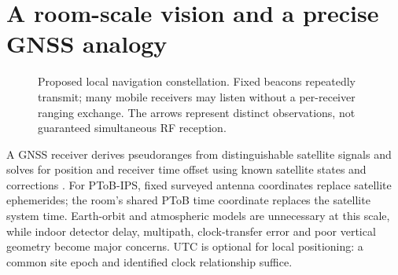 \documentclass[11pt,letterpaper]{article}
\begin{document}
\section{A room-scale vision and a precise GNSS analogy}\label{sec:vision}
\begin{figure}[ht]\centering
{}
\caption{Proposed local navigation constellation. Fixed beacons repeatedly transmit; many mobile receivers may listen without a per-receiver ranging exchange. The arrows represent distinct observations, not guaranteed simultaneous RF reception.}\label{fig:room}
\end{figure}

A GNSS receiver derives pseudoranges from distinguishable satellite signals and solves for position and receiver time offset using known satellite states and corrections \cite{esacode}. For PToB-IPS, fixed surveyed antenna coordinates replace satellite ephemerides; the room's shared PToB time coordinate replaces the satellite system time. Earth-orbit and atmospheric models are unnecessary at this scale, while indoor detector delay, multipath, clock-transfer error and poor vertical geometry become major concerns. UTC is optional for local positioning: a common site epoch and identified clock relationship suffice.
\end{document}
